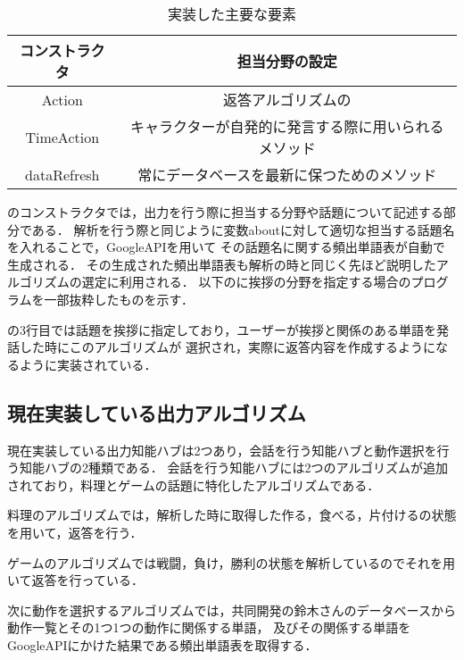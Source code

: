 \begin{table}[tbh]
	\caption{実装した主要な要素} \label{tab:parts}
	\begin{center}
		\begin{tabular}[htb]{c|c}
		\hline
		コンストラクタ & 担当分野の設定 \\
		\hline
		Action & 返答アルゴリズムの \\
		\hline
		TimeAction & キャラクターが自発的に発言する際に用いられるメソッド \\
		\hline
		dataRefresh & 常にデータベースを最新に保つためのメソッド \\
		\hline
		\end{tabular}
	\end{center}
\end{table}

のコンストラクタでは，出力を行う際に担当する分野や話題について記述する部分である．
解析を行う際と同じように変数aboutに対して適切な担当する話題名を入れることで，GoogleAPIを用いて
その話題名に関する頻出単語表が自動で生成される．
その生成された頻出単語表も解析の時と同じく先ほど説明したアルゴリズムの選定に利用される．
以下のに挨拶の分野を指定する場合のプログラムを一部抜粋したものを示す．


の3行目では話題を挨拶に指定しており，ユーザーが挨拶と関係のある単語を発話した時にこのアルゴリズムが
選択され，実際に返答内容を作成するようになるように実装されている．

\subsection{現在実装している出力アルゴリズム}\label{sec:back}
現在実装している出力知能ハブは2つあり，会話を行う知能ハブと動作選択を行う知能ハブの2種類である．
会話を行う知能ハブには2つのアルゴリズムが追加されており，料理とゲームの話題に特化したアルゴリズムである．

料理のアルゴリズムでは，解析した時に取得した作る，食べる，片付けるの状態を用いて，返答を行う．

ゲームのアルゴリズムでは戦闘，負け，勝利の状態を解析しているのでそれを用いて返答を行っている．

次に動作を選択するアルゴリズムでは，共同開発の鈴木さんのデータベースから動作一覧とその1つ1つの動作に関係する単語，
及びその関係する単語をGoogleAPIにかけた結果である頻出単語表を取得する．

